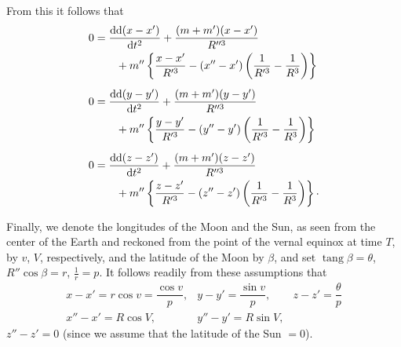 \clearpage
\begingroup
{}
\renewcommand{\headrulewidth}{0pt}
\par\noindent From this it follows that
\[
\begin{aligned}
0&=\frac{\mathrm{dd}(x-x')}{\mathrm{d}t^2}
  +\frac{(m+m')(x-x')}{R''^3}\\
 &\qquad+m''\left\{\frac{x-x'}{R'^3}
  -(x''-x')\left(\frac{1}{R'^3}-\frac{1}{R^3}\right)\right\}\\[5pt]
0&=\frac{\mathrm{dd}(y-y')}{\mathrm{d}t^2}
  +\frac{(m+m')(y-y')}{R''^3}\\
 &\qquad+m''\left\{\frac{y-y'}{R'^3}
  -(y''-y')\left(\frac{1}{R'^3}-\frac{1}{R^3}\right)\right\}\\[5pt]
0&=\frac{\mathrm{dd}(z-z')}{\mathrm{d}t^2}
  +\frac{(m+m')(z-z')}{R''^3}\\
 &\qquad+m''\left\{\frac{z-z'}{R'^3}
  -(z''-z')\left(\frac{1}{R'^3}-\frac{1}{R^3}\right)\right\}
  \mathpunct{\raisebox{.4ex}{.}}
\end{aligned}
\]

\par\noindent\hspace*{\parindent}Finally, we denote the longitudes of the Moon and the Sun, as seen from
the center of the Earth and reckoned from the point of the vernal equinox at time \(T\),
by \(v\), \(V\), respectively, and the latitude of the Moon by \(\beta\), and set
\(\operatorname{tang}\beta=\theta\), \(R''\cos\beta=r\), \(\frac{1}{r}=p\). It follows
readily from these assumptions that
\[
\begin{array}{lll}
x-x'=r\cos v=\dfrac{\cos v}{p},&
y-y'=\dfrac{\sin v}{p},&z-z'=\dfrac{\theta}{p}\\[5pt]
x''-x'=R\cos V,&y''-y'=R\sin V,&
\end{array}
\]
\noindent\(z''-z'=0\) (since we assume that the latitude of the Sun \(=0\)).

